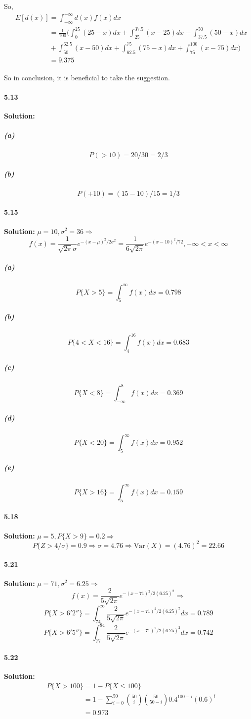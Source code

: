 \documentclass[11pt]{article}
\begin{document}
		So, \begin{align}
			&E[d(x)] = \int^{+\infty}_{-\infty}d(x)f(x)dx\nonumber\\
			&\phantom{E[d(x)]} = \frac{1}{100}(\int_{0}^{25} (25 - x)dx + \int_{25}^{37.5} (x - 25)dx + \int_{37.5}^{50} (50 - x)dx \nonumber\\
			&\phantom{E[d(x)]}+ \int_{50}^{62.5} (x - 50)dx + \int_{62.5}^{75} (75 - x)dx + \int_{75}^{100} (x - 75)dx)\nonumber\\
			&\phantom{E[d(x)]} = 9.375\nonumber
		\end{align}
		
		So in conclusion, it is beneficial to take the suggestion.
	\paragraph{5.13}\textbf{Solution:}
		\subparagraph{(a)}
			\[P(>10) = 20/30 = 2/3\]
		\subparagraph{(b)}
			\[P(+10) = (15 - 10)/15 = 1/3\]
	\paragraph{5.15}\textbf{Solution:}
			$\mu = 10, \sigma^2 = 36 \Rightarrow$
			\[f(x) = \frac{1}{\sqrt{2\pi}\sigma}e^{-(x - \mu)^2/2\sigma^2} = \frac{1}{6\sqrt{2\pi}}e^{-(x - 10)^2/72}, -\infty < x < \infty\]
		\subparagraph{(a)}
			\[P\{X > 5\} = \int_5^{\infty}f(x)dx = 0.798\]
		\subparagraph{(b)}
			\[P\{4 < X < 16\} = \int_4^{16}f(x)dx = 0.683\]
		\subparagraph{(c)}
			\[P\{X < 8\} = \int_{-\infty}^{8}f(x)dx = 0.369\]
		\subparagraph{(d)}
			\[P\{X < 20\} = \int_5^{\infty}f(x)dx = 0.952\]
		\subparagraph{(e)}
			\[P\{X > 16\} = \int_5^{\infty}f(x)dx = 0.159\]
	\paragraph{5.18}\textbf{Solution:}
		$\mu = 5, P\{X > 9\} = 0.2 \Rightarrow$
		\[P\{Z > 4/\sigma\} = 0.9 \Rightarrow \sigma = 4.76 \Rightarrow \mathrm{Var}(X) = (4.76)^2 = 22.66\]
	\paragraph{5.21}\textbf{Solution:}
		$\mu = 71, \sigma^2 = 6.25 \Rightarrow$
		\[f(x) = \frac{2}{5\sqrt{2\pi}}e^{-(x - 71)^2/2(6.25)^2} \Rightarrow\]
		\[P\{X > 6'2''\} = \int_{74}^{\infty}\frac{2}{5\sqrt{2\pi}}e^{-(x - 71)^2/2(6.25)^2}dx = 0.789\]
		\[P\{X > 6'5''\} = \int_{77}^{84}\frac{2}{5\sqrt{2\pi}}e^{-(x - 71)^2/2(6.25)^2}dx = 0.742\]
	\paragraph{5.22}\textbf{Solution:}
		\begin{align}
			&P\{X > 100\} = 1 - P\{X \leq 100\}\nonumber\\
			&\phantom{P\{X > 100\}} = 1 - \sum_{i=0}^{50} \binom{50}{i} \binom{50}{50 - i} 0.4^{100 - i}(0.6)^i\nonumber\\
			&\phantom{P\{X > 100\}} = 0.973\nonumber 
		\end{align}
\end{document}
